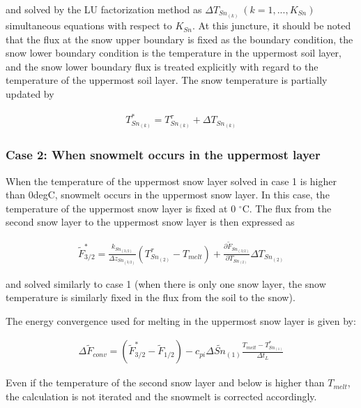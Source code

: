 and solved by the LU factorization method as \(\Delta T_{Sn_{(k)}}\ (k = 1, ..., K_{Sn})\) simultaneous equations with respect to \(K_{Sn}\). At this juncture, it should be noted that the flux at the
snow upper boundary is fixed as the boundary condition, the snow lower boundary condition is the temperature in the uppermost soil layer, and the snow lower boundary flux is treated explicitly with
regard to the temperature of the uppermost soil layer. The snow temperature is partially updated by

\begin{eqnarray}
T_{Sn_{(k)}}^{\ast} = T_{Sn_{(k)}}^{\tau} + \Delta T_{Sn_{(k)}} \label{8-40}
\end{eqnarray}

\hypertarget{case-2-when-snowmelt-occurs-in-the-uppermost-layer}{%
\subsubsection{Case 2: When snowmelt occurs in the uppermost layer}\label{case-2-when-snowmelt-occurs-in-the-uppermost-layer}}

When the temperature of the uppermost snow layer solved in case 1 is higher than 0degC, snowmelt occurs in the uppermost snow layer. In this case, the temperature of the uppermost snow layer is fixed
at 0 \(^\circ\mathrm{C}\). The flux from the second snow layer to the uppermost snow layer is then expressed as

\begin{eqnarray}
\widetilde{F}_{3/2}^{\ast}
 = \frac{k_{Sn_{(3/2)}}}{\Delta z_{Sn_{(3/2)}}} (T_{Sn_{(2)}}^{\tau} - T_{melt})
 +\frac{\partial \widetilde{F}_{Sn_{(3/2)}}}{\partial T_{Sn_{(2)}}}
 \Delta T_{Sn_{(2)}} \label{8-41}
\end{eqnarray}

and solved similarly to case 1 (when there is only one snow layer, the snow temperature is similarly fixed in the flux from the soil to the snow).

The energy convergence used for melting in the uppermost snow layer is given by:

\begin{eqnarray}
\Delta \widetilde{F}_{conv}
 = (\widetilde{F}_{3/2}^{\ast} - \widetilde{F}_{1/2})
 - c_{pi}\Delta \widetilde{Sn}_{(1)} \frac{T_{melt}-T_{Sn_{(1)}}^{\ast}}{\Delta t_L} \label{8-42}
\end{eqnarray}

Even if the temperature of the second snow layer and below is higher than \(T_{melt}\), the calculation is not iterated and the snowmelt is corrected accordingly.

